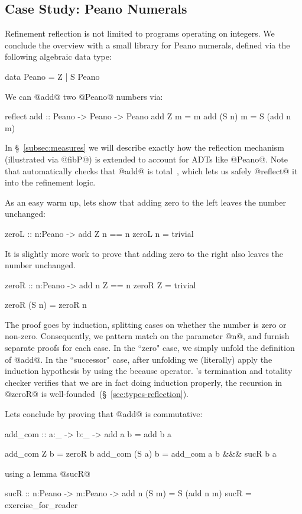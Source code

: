 \subsection{Case Study: Peano Numerals}

Refinement reflection is not limited to programs
operating on integers. We conclude the overview
with a small library for Peano numerals, defined
via the following algebraic data type:
%
\begin{code}
  data Peano = Z | S Peano
\end{code}
%
We can @add@ two @Peano@ numbers via:
%
\begin{code}
  reflect add :: Peano -> Peano -> Peano
  add Z     m = m
  add (S n) m = S (add n m)
\end{code}
%
In \S~\ref{subsec:measures} we will describe
exactly how the reflection mechanism (illustrated
via @fibP@) is extended to account for ADTs like @Peano@.
%
Note that \toolname automatically checks
that @add@ is total~\citep{Vazou14}, which
lets us safely @reflect@ it into the
refinement logic.

%
As an easy warm up, lets show that
adding zero to the left leaves the
number unchanged:
%
\begin{code}
  zeroL :: n:Peano -> { add Z n == n }
  zeroL n = trivial
\end{code}

%
It is slightly more work to prove
that adding zero to the right also
leaves the number unchanged.
%
\begin{mcode}
  zeroR :: n:Peano -> { add n Z == n }
  zeroR Z     =  trivial

  zeroR (S n) =  zeroR n
\end{mcode}
%
The proof goes by induction, splitting cases on
whether the number is zero or non-zero. Consequently,
we pattern match on the parameter @n@, and furnish
separate proofs for each case.
%
In the ``zero" case, we simply unfold the definition
of @add@.
%
In the ``successor" case, after unfolding we (literally)
apply the induction hypothesis by using the because operator.
%
\toolname's termination and totality checker
verifies that we are in fact doing induction
properly, \ie the recursion in @zeroR@ is
well-founded~(\S~\ref{sec:types-reflection}).

%
Lets conclude by proving that @add@ is commutative:
%
\begin{mcode}
add_com :: a:_ -> b:_ -> {add a b = add b a}

add_com    Z  b =  zeroR b
add_com (S a) b =  add_com a b &&& sucR b a
\end{mcode}
%
using a lemma @sucR@
%
\begin{code}
  sucR :: n:Peano -> m:Peano ->
                {add n (S m) = S (add n m)}
  sucR = exercise_for_reader
\end{code}

